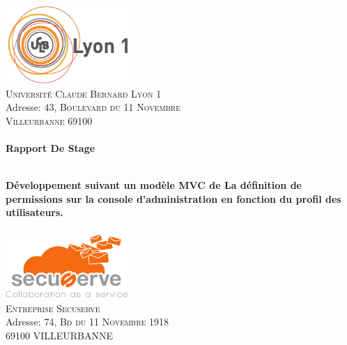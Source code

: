\begin{titlepage}
\begin{center}

\includegraphics[width=0.35\textwidth]{./logo_lyon1_2.jpg}~\\[0.2cm]

\textsc{\LARGE Université Claude Bernard Lyon 1}\\
Adresse: \textsc{43, Boulevard du 11 Novembre  \\ Villeurbanne 69100}\\[1cm]

\textsc{\Large }\\[0.5cm]

{\huge \bfseries Rapport De Stage\\}

\HRule \\[0.4cm]

{\huge \bfseries \Large Développement suivant un modèle MVC de La définition de permissions sur la console d'administration en fonction du profil des utilisateurs.} \\[0.4cm]

\HRule \\[1.5cm]

\includegraphics[width=0.35\textwidth]{./secuserve_logo.png}~\\[0.2cm]

\textsc{\LARGE Entreprise Secuserve}\\
Adresse: \textsc{74, Bd du 11 Novembre 1918 \\ 69100 VILLEURBANNE}\\[2.5cm]


\end{center}
\end{titlepage}
